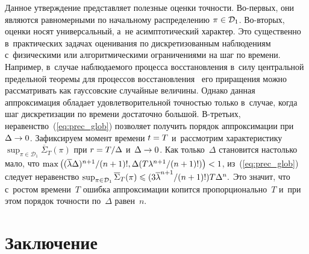 \begin{multicols}{2}
 Данное утверждение представляет полезные оценки точности. Во-пер\-вых, 
 они являются равномерными по начальному распределению $\pi \hm\in \mathcal{D}_1$. 
 Во-вто\-рых, оценки носят универсальный, а~не асимптотический характер. Это 
 существенно в~практических задачах оценивания по дискретизованным 
 наблюдениям с~физическими или алгоритмическими ограничениями на шаг 
 по времени. Например, в~случае наблюдаемого процесса восстановления в~силу 
 центральной предельной теоремы для процессов восстановления~\cite{B_80} его
  приращения можно рассматривать как гауссовские случайные величины. 
  Однако данная аппроксимация обладает удовлетворительной точностью 
  только в~случае, когда шаг дискретизации по времени достаточно большой. 
 В-третьих, неравенство~(\ref{eq:prec_glob}) позволяет получить порядок 
 аппроксимации при $\Delta \hm\to 0$. Зафиксируем момент времени $t\hm=T$ и~рассмотрим 
 характеристику $\sup\nolimits_{\pi \in \mathcal{D}_1} 
 \overline{\Sigma}_{T}(\pi)$ при $r\hm={T}/{\Delta}$ и~$\Delta \hm\to 0$. 
 Как только~$\Delta$ становится настолько мало, что 
 $\max\left({(\overline{\lambda}\Delta)^{n+1}}/{(n+1)!}, 
 \Delta ({T\lambda^{n+1}}/{(n+1)!})\right)\hm< 1$, из~(\ref{eq:prec_glob}) 
 следует неравенство
  $\sup\nolimits_{\pi \in \mathcal{D}_1} \overline{\Sigma}_{T}(\pi) 
  \hm\leqslant  ({3\overline{\lambda}^{n+1}}/{(n+1)!}) T\Delta^n.$
 Это значит, что с~ростом времени~$T$ 
 ошибка аппроксимации копится пропорционально~$T$ и~при этом порядок точности 
 по~$\Delta$ равен~$n$.
 
 
  \section{Заключение}
  
  \vspace*{-4pt}
 

\end{multicols}
